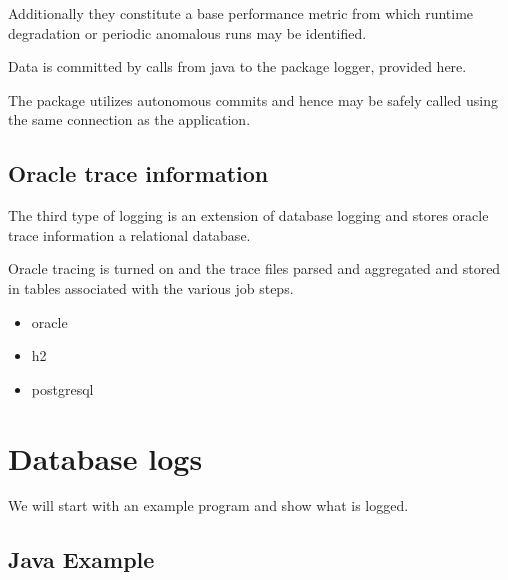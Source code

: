 \documentclass[letterpaper,10pt,english]{sphinxmanual}
\begin{document}
Additionally they constitute a base performance metric from which
runtime degradation or periodic anomalous runs may be identified.

Data is committed by calls from java to the package logger, provided
here.

The package utilizes autonomous commits and hence may be safely called
using the same connection as the application.


\section{Oracle trace information}
\label{index:oracle-trace-information}
The third type of logging is an extension of database logging and stores
oracle trace information a relational database.

Oracle tracing is turned on and the trace files parsed and aggregated
and stored in tables associated with the various job steps.
\begin{itemize}
\item {} 
oracle

\item {} 
h2

\item {} 
postgresql

\end{itemize}


\chapter{Database logs}
\label{index:database-logs}
We will start with an example program and show what is logged.


\section{Java Example}
\label{index:java-example}
\begin{Verbatim}[commandchars=\\\{\}]
\end{Verbatim}
\end{document}
